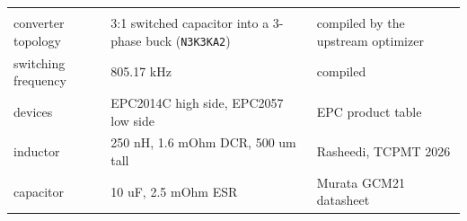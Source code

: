 \documentclass[10pt,]{article}
\begin{document}
\begin{longtable}[]{@{}lll@{}}
\begin{minipage}[t]{0.30\columnwidth}
\end{minipage}\tabularnewline
\begin{minipage}[t]{0.30\columnwidth}\raggedright
converter topology\strut
\end{minipage} & \begin{minipage}[t]{0.30\columnwidth}\raggedright
3:1 switched capacitor into a 3-phase buck (\texttt{N3K3KA2})\strut
\end{minipage} & \begin{minipage}[t]{0.30\columnwidth}\raggedright
compiled by the upstream optimizer\strut
\end{minipage}\tabularnewline
\begin{minipage}[t]{0.30\columnwidth}\raggedright
switching frequency\strut
\end{minipage} & \begin{minipage}[t]{0.30\columnwidth}\raggedright
805.17 kHz\strut
\end{minipage} & \begin{minipage}[t]{0.30\columnwidth}\raggedright
compiled\strut
\end{minipage}\tabularnewline
\begin{minipage}[t]{0.30\columnwidth}\raggedright
devices\strut
\end{minipage} & \begin{minipage}[t]{0.30\columnwidth}\raggedright
EPC2014C high side, EPC2057 low side\strut
\end{minipage} & \begin{minipage}[t]{0.30\columnwidth}\raggedright
EPC product table\strut
\end{minipage}\tabularnewline
\begin{minipage}[t]{0.30\columnwidth}\raggedright
inductor\strut
\end{minipage} & \begin{minipage}[t]{0.30\columnwidth}\raggedright
250 nH, 1.6 mOhm DCR, 500 um tall\strut
\end{minipage} & \begin{minipage}[t]{0.30\columnwidth}\raggedright
Rasheedi, TCPMT 2026\strut
\end{minipage}\tabularnewline
\begin{minipage}[t]{0.30\columnwidth}\raggedright
capacitor\strut
\end{minipage} & \begin{minipage}[t]{0.30\columnwidth}\raggedright
10 uF, 2.5 mOhm ESR\strut
\end{minipage} & \begin{minipage}[t]{0.30\columnwidth}\raggedright
Murata GCM21 datasheet\strut
\end{minipage}\tabularnewline
\bottomrule
\end{longtable}
\end{document}
